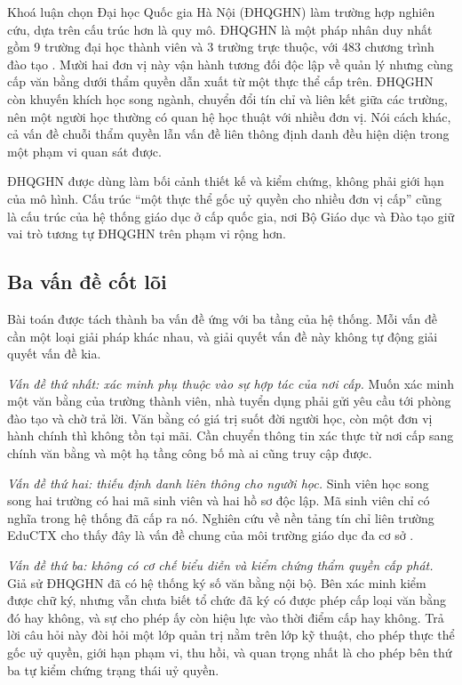 Khoá luận chọn Đại học Quốc gia Hà Nội (ĐHQGHN) làm trường hợp nghiên cứu, dựa trên cấu trúc hơn là quy mô. ĐHQGHN là một pháp nhân duy nhất gồm 9 trường đại học thành viên và 3 trường trực thuộc, với 483 chương trình đào tạo \cite{VNU_Report2026}. Mười hai đơn vị này vận hành tương đối độc lập về quản lý nhưng cùng cấp văn bằng dưới thẩm quyền dẫn xuất từ một thực thể cấp trên. ĐHQGHN còn khuyến khích học song ngành, chuyển đổi tín chỉ và liên kết giữa các trường, nên một người học thường có quan hệ học thuật với nhiều đơn vị. Nói cách khác, cả vấn đề chuỗi thẩm quyền lẫn vấn đề liên thông định danh đều hiện diện trong một phạm vi quan sát được.

ĐHQGHN được dùng làm bối cảnh thiết kế và kiểm chứng, không phải giới hạn của mô hình. Cấu trúc ``một thực thể gốc uỷ quyền cho nhiều đơn vị cấp'' cũng là cấu trúc của hệ thống giáo dục ở cấp quốc gia, nơi Bộ Giáo dục và Đào tạo giữ vai trò tương tự ĐHQGHN trên phạm vi rộng hơn.

\subsection{Ba vấn đề cốt lõi}

Bài toán được tách thành ba vấn đề ứng với ba tầng của hệ thống. Mỗi vấn đề cần một loại giải pháp khác nhau, và giải quyết vấn đề này không tự động giải quyết vấn đề kia.

\textit{Vấn đề thứ nhất: xác minh phụ thuộc vào sự hợp tác của nơi cấp.} Muốn xác minh một văn bằng của trường thành viên, nhà tuyển dụng phải gửi yêu cầu tới phòng đào tạo và chờ trả lời. Văn bằng có giá trị suốt đời người học, còn một đơn vị hành chính thì không tồn tại mãi. Cần chuyển thông tin xác thực từ nơi cấp sang chính văn bằng và một hạ tầng công bố mà ai cũng truy cập được.

\textit{Vấn đề thứ hai: thiếu định danh liên thông cho người học.} Sinh viên học song song hai trường có hai mã sinh viên và hai hồ sơ độc lập. Mã sinh viên chỉ có nghĩa trong hệ thống đã cấp ra nó. Nghiên cứu về nền tảng tín chỉ liên trường EduCTX cho thấy đây là vấn đề chung của môi trường giáo dục đa cơ sở \cite{Turkanovic2018}.

\textit{Vấn đề thứ ba: không có cơ chế biểu diễn và kiểm chứng thẩm quyền cấp phát.} Giả sử ĐHQGHN đã có hệ thống ký số văn bằng nội bộ. Bên xác minh kiểm được chữ ký, nhưng vẫn chưa biết tổ chức đã ký có được phép cấp loại văn bằng đó hay không, và sự cho phép ấy còn hiệu lực vào thời điểm cấp hay không. Trả lời câu hỏi này đòi hỏi một lớp quản trị nằm trên lớp kỹ thuật, cho phép thực thể gốc uỷ quyền, giới hạn phạm vi, thu hồi, và quan trọng nhất là cho phép bên thứ ba tự kiểm chứng trạng thái uỷ quyền.

